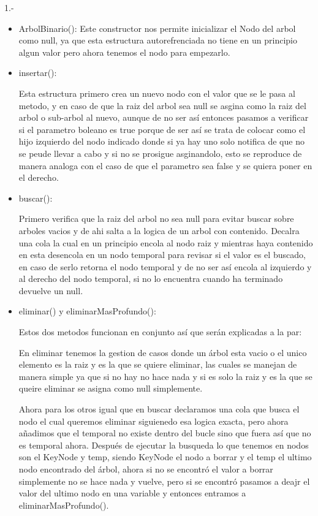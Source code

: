\begin{respuesta}{1.-}
    \begin{itemize}
        \item ArbolBinario(): Este constructor nos permite inicializar el Nodo del arbol como null, ya que esta estructura autorefrenciada no tiene en un principio algun valor pero ahora tenemos el nodo para empezarlo.
        \item insertar():
        
        Esta estructura primero crea un nuevo nodo con el valor que se le pasa al metodo, y en caso de que la raiz del arbol sea null se asgina como la raiz del arbol o sub-arbol al nuevo, aunque de no ser así entonces pasamos a verificar si el parametro boleano es true porque de ser así se trata de colocar como el hijo izquierdo del nodo indicado donde si ya hay uno solo notifica de que no se peude llevar a cabo y si no se prosigue asginandolo, esto se reproduce de manera analoga con el caso de que el parametro sea false y se quiera poner en el derecho.
        \item buscar():

        Primero verifica que la raiz del arbol no sea null para evitar buscar sobre arboles vacios y de ahi salta a la logica de un arbol con contenido. Decalra una cola la cual en un principio encola al nodo raiz y mientras haya contenido en esta desencola en un nodo temporal para revisar si el valor es el buscado, en caso de serlo retorna el nodo temporal y de no ser así encola al izquierdo y al derecho del nodo temporal, si no lo encuentra cuando ha terminado devuelve un null.

        \item eliminar() y eliminarMasProfundo():

        Estos dos metodos funcionan en conjunto así que serán explicadas a la par:

        En eliminar tenemos la gestion de casos donde un árbol esta vacio o el unico elemento es la raiz y es la que se quiere eliminar, las cuales se manejan de manera simple ya que si no hay no hace nada y si es solo la raiz y es la que se queire eliminar se asigna como null simplemente.

        Ahora para los otros igual que en buscar declaramos una cola que busca el nodo el cual queremos eliminar siguienedo esa logica exacta, pero ahora añadimos que el temporal no existe dentro del bucle sino que fuera así que no es temporal ahora. Después de ejecutar la busqueda lo que tenemos en nodos son el KeyNode y temp, siendo KeyNode el nodo a borrar y el temp el ultimo nodo encontrado del árbol, ahora si no se encontró el valor a borrar simplemente no se hace nada y vuelve, pero si se encontró pasamos a deajr el valor del ultimo nodo en una variable y entonces entramos a eliminarMasProfundo().


\end{itemize}
\end{respuesta}
